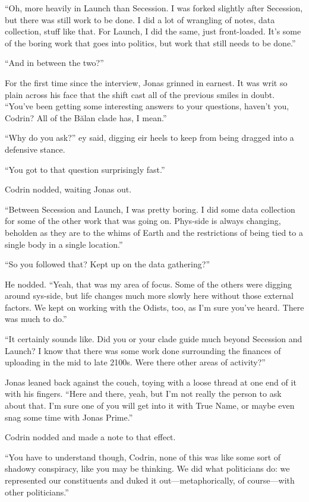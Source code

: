 ``Oh, more heavily in Launch than Secession. I was forked slightly after Secession, but there was still work to be done. I did a lot of wrangling of notes, data collection, stuff like that. For Launch, I did the same, just front-loaded. It's some of the boring work that goes into politics, but work that still needs to be done.''

``And in between the two?''

For the first time since the interview, Jonas grinned in earnest. It was writ so plain across his face that the shift cast all of the previous smiles in doubt. ``You've been getting some interesting answers to your questions, haven't you, Codrin? All of the Bălan clade has, I mean.''

``Why do you ask?'' ey said, digging eir heels to keep from being dragged into a defensive stance.

``You got to that question surprisingly fast.''

Codrin nodded, waiting Jonas out.

``Between Secession and Launch, I was pretty boring. I did some data collection for some of the other work that was going on. Phys-side is always changing, beholden as they are to the whims of Earth and the restrictions of being tied to a single body in a single location.''

``So you followed that? Kept up on the data gathering?''

He nodded. ``Yeah, that was my area of focus. Some of the others were digging around sys-side, but life changes much more slowly here without those external factors. We kept on working with the Odists, too, as I'm sure you've heard. There was much to do.''

``It certainly sounds like. Did you or your clade guide much beyond Secession and Launch? I know that there was some work done surrounding the finances of uploading in the mid to late 2100s. Were there other areas of activity?''

Jonas leaned back against the couch, toying with a loose thread at one end of it with his fingers. ``Here and there, yeah, but I'm not really the person to ask about that. I'm sure one of you will get into it with True Name, or maybe even snag some time with Jonas Prime.''

Codrin nodded and made a note to that effect.

``You have to understand though, Codrin, none of this was like some sort of shadowy conspiracy, like you may be thinking. We did what politicians do: we represented our constituents and duked it out---metaphorically, of course---with other politicians.''

